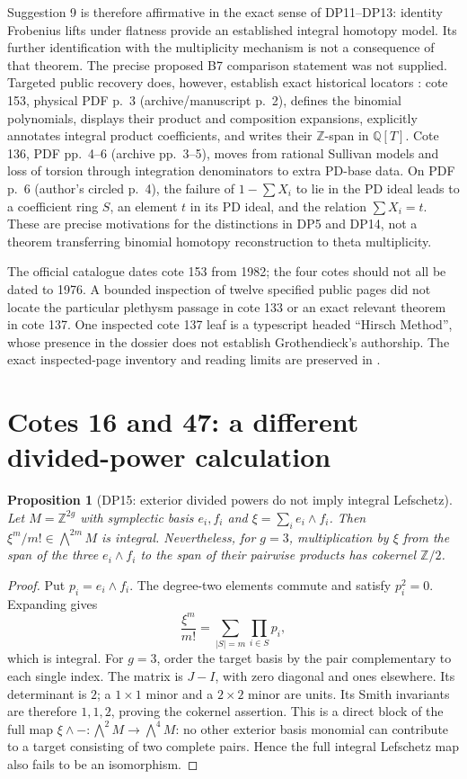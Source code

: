 \documentclass[11pt,a4paper]{article}
\newtheorem{proposition}[theorem]{Proposition}
\theoremstyle{definition}\newtheorem{remark}[theorem]{Remark}
\newcommand{\Z}{\mathbb Z}\newcommand{\Q}{\mathbb Q}\newcommand{\F}{\mathbb F}
\begin{document}
Suggestion 9 is therefore affirmative in the exact sense of DP11--DP13: identity Frobenius lifts under flatness provide an established integral homotopy model. Its further identification with the multiplicity mechanism is not a consequence of that theorem. The precise proposed B7 comparison statement was not supplied. Targeted public recovery does, however, establish exact historical locators \cite{PublicArchive}: cote 153, physical PDF p.~3 (archive/manuscript p.~2), defines the binomial polynomials, displays their product and composition expansions, explicitly annotates integral product coefficients, and writes their $\Z$-span in $\Q[T]$. Cote 136, PDF pp.~4--6 (archive pp.~3--5), moves from rational Sullivan models and loss of torsion through integration denominators to extra PD-base data. On PDF p.~6 (author's circled p.~4), the failure of $1-\sum X_i$ to lie in the PD ideal leads to a coefficient ring $S$, an element $t$ in its PD ideal, and the relation $\sum X_i=t$. These are precise motivations for the distinctions in DP5 and DP14, not a theorem transferring binomial homotopy reconstruction to theta multiplicity.

The official catalogue dates cote 153 from 1982; the four cotes should not all be dated to 1976. A bounded inspection of twelve specified public pages did not locate the particular plethysm passage in cote 133 or an exact relevant theorem in cote 137. One inspected cote 137 leaf is a typescript headed ``Hirsch Method'', whose presence in the dossier does not establish Grothendieck's authorship. The exact inspected-page inventory and reading limits are preserved in .

\section{Cotes 16 and 47: a different divided-power calculation}

\begin{proposition}[DP15: exterior divided powers do not imply integral Lefschetz]\label{DP15}
Let $M=\Z^{2g}$ with symplectic basis $e_i,f_i$ and $\xi=\sum_i e_i\wedge f_i$. Then $\xi^m/m!\in\bigwedge^{2m}M$ is integral. Nevertheless, for $g=3$, multiplication by $\xi$ from the span of the three $e_i\wedge f_i$ to the span of their pairwise products has cokernel $\Z/2$.
\end{proposition}
\begin{proof}
Put $p_i=e_i\wedge f_i$. The degree-two elements commute and satisfy $p_i^2=0$. Expanding gives
\[
 \frac{\xi^m}{m!}=\sum_{|S|=m}\prod_{i\in S}p_i,
\]
which is integral. For $g=3$, order the target basis by the pair complementary to each single index. The matrix is $J-I$, with zero diagonal and ones elsewhere. Its determinant is $2$; a $1\times1$ minor and a $2\times2$ minor are units. Its Smith invariants are therefore $1,1,2$, proving the cokernel assertion. This is a direct block of the full map $\xi\wedge-:\bigwedge^2M\to\bigwedge^4M$: no other exterior basis monomial can contribute to a target consisting of two complete pairs. Hence the full integral Lefschetz map also fails to be an isomorphism.
\end{proof}
\end{document}
